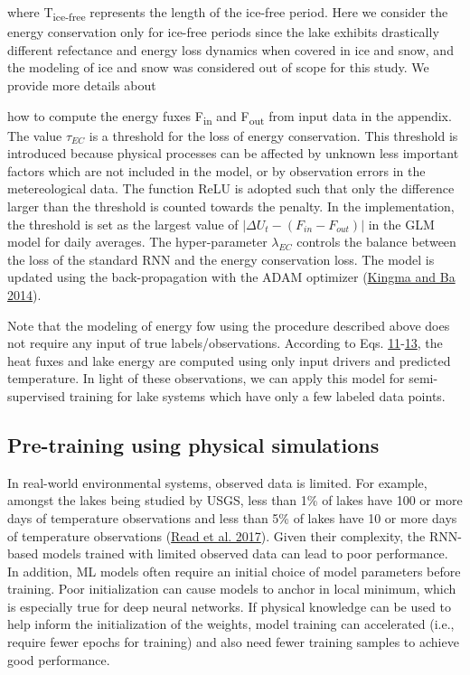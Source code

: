 \documentclass[book.tex]{subfiles}
\begin{document}
where T\textsubscript{ice-free} represents the length of the ice-free
period. Here we consider the energy conservation only for ice-free
periods since the lake exhibits drastically different refectance and
energy loss dynamics when covered in ice and snow, and the modeling of ice and snow was considered out of scope for
this study. We provide more details about

how to compute the energy fuxes F\textsubscript{in} and
F\textsubscript{out} from input data in the appendix. The value $\tau_{EC}$ is a
threshold for the loss of energy conservation. This threshold is
introduced because physical processes can be affected by unknown
less important factors which are not included in the model, or by
observation errors in the metereological data. The function ReLU is
adopted such that only the difference larger than the threshold is
counted towards the penalty. In the implementation, the threshold is set
as the largest value of $|\Delta U_t - (F_{in}-F_{out})|$ in the GLM model for daily averages. The
hyper-parameter $\lambda_{EC}$ controls the balance between the loss of the
standard RNN and the energy conservation loss. The model is updated using
the back-propagation with the ADAM optimizer
(\protect\hyperlink{page23}{Kingma and Ba 2014}).

Note that the modeling of energy fow using the procedure described above
does not require any input of true labels/observations. According to
Eqs. \protect\hyperlink{page25}{11}-\protect\hyperlink{page26}{13}, the
heat fuxes and lake energy are computed using only input drivers and
predicted temperature. In light of these observations, we can apply this
model for semi-supervised training for lake systems which have only a
few labeled data points.

\subsection{Pre-training using physical simulations}

In real-world environmental systems, observed data is limited. For
example, amongst the lakes being studied by USGS, less than 1\% of lakes
have 100 or more days of temperature observations and less than 5\% of
lakes have 10 or more days of temperature observations
(\protect\hyperlink{page24}{Read et al. 2017}). Given their complexity,
the RNN-based models trained with limited observed data can lead to poor
performance. In addition, ML models often require an initial choice of
model parameters before training. Poor initialization can cause models
to anchor in local minimum, which is especially true for deep neural
networks. If physical knowledge can be used to help inform the
initialization of the weights, model training can accelerated (i.e.,
require fewer epochs for training) and also need fewer training samples
to achieve good performance.
\end{document}
